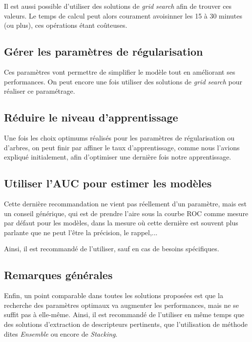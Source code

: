 Il est aussi possible d'utiliser des solutions de \textit{grid search} afin de trouver ces valeurs. Le temps de calcul peut alors courament avoisinner les 15 à 30 minutes (ou plus), ces opérations étant coûteuses.
\subsection{Gérer les paramètres de régularisation}
Ces paramètres vont permettre de simplifier le modèle tout en améliorant ses performances. On peut encore une fois utiliser des solutions de \textit{grid search} pour réaliser ce paramétrage.
\subsection{Réduire le niveau d'apprentissage}Une fois les choix optimums réalisés pour les paramètres de régularisation ou d'arbres, on peut finir par affiner le taux d'apprentissage, comme nous l'avions expliqué initialement, afin d'optimiser une dernière fois notre apprentissage.
\subsection{Utiliser l'AUC pour estimer les modèles}
Cette dernière recommandation ne vient pas réellement d'un paramètre, mais est un conseil générique, qui est de prendre l'aire sous la courbe ROC comme mesure par défaut pour les modèles, dans la mesure où cette dernière est souvent plus parlante que ne peut l'être la précision, le rappel,...

Ainsi, il est recommandé de l'utiliser, sauf en cas de besoins spécifiques.
\subsection{Remarques générales}Enfin, un point comparable dans toutes les solutions proposées est que la recherche des paramètres optimaux va augmenter les performances, mais ne se suffit pas à elle-même. Ainsi, il est recommandé de l'utiliser en même temps que des solutions d'extraction de descripteurs pertinents, que l'utilisation de méthode dites \textit{Ensemble} ou encore de \textit{Stacking}.
